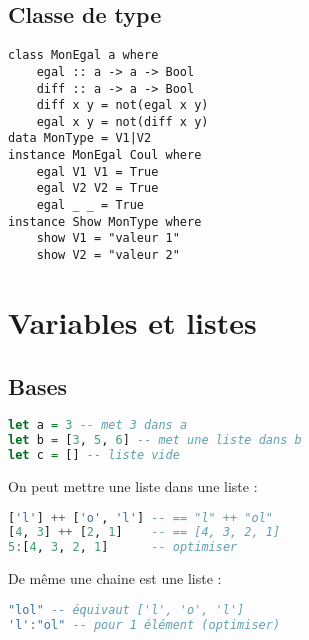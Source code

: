         \subsection{Classe de type}
            \begin{lstlisting}
class MonEgal a where
	egal :: a -> a -> Bool
	diff :: a -> a -> Bool
	diff x y = not(egal x y)
	egal x y = not(diff x y)
data MonType = V1|V2
instance MonEgal Coul where
	egal V1 V1 = True
	egal V2 V2 = True
	egal _ _ = True
instance Show MonType where
	show V1 = "valeur 1"
	show V2 = "valeur 2"
            \end{lstlisting}

    \section{Variables et listes}
        \subsection{Bases}
            \begin{lstlisting}[language=Haskell]
let a = 3 -- met 3 dans a
let b = [3, 5, 6] -- met une liste dans b
let c = [] -- liste vide
            \end{lstlisting}
            On peut mettre une liste dans une liste :
            \begin{lstlisting}[language=Haskell]
['l'] ++ ['o', 'l'] -- == "l" ++ "ol"
[4, 3] ++ [2, 1]    -- == [4, 3, 2, 1]
5:[4, 3, 2, 1]      -- optimiser
            \end{lstlisting}
            De même une chaine est une liste :
            \begin{lstlisting}[language=Haskell]
"lol" -- équivaut ['l', 'o', 'l']
'l':"ol" -- pour 1 élément (optimiser)
            \end{lstlisting}
